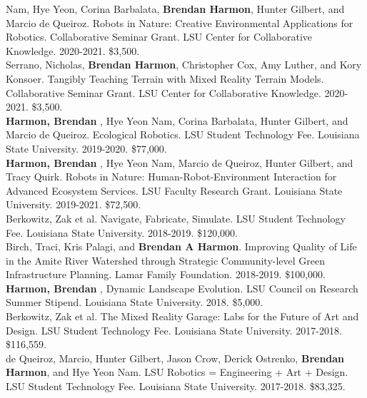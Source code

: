 \documentclass[10pt]{developercv} %
\begin{document}
Nam, Hye Yeon, Corina Barbalata, \textbf{Brendan Harmon}, Hunter Gilbert, and Marcio de Queiroz.
Robots in Nature: Creative Environmental Applications for Robotics.
Collaborative Seminar Grant. LSU Center for Collaborative Knowledge.
2020-2021. \$3,500.\\

Serrano, Nicholas, \textbf{Brendan Harmon}, Christopher Cox, Amy Luther, and Kory Konsoer.
Tangibly Teaching Terrain with Mixed Reality Terrain Models.
Collaborative Seminar Grant. LSU Center for Collaborative Knowledge.
2020-2021. \$3,500.\\

\textbf{Harmon, Brendan }, Hye Yeon Nam, Corina Barbalata, Hunter Gilbert, and Marcio de Queiroz.
Ecological Robotics.
LSU Student Technology Fee. Louisiana State University. 
2019-2020.	\$77,000.\\

\textbf{Harmon, Brendan }, Hye Yeon Nam, Marcio de Queiroz, Hunter Gilbert, and Tracy Quirk. 
Robots in Nature: Human-Robot-Environment Interaction for Advanced Ecosystem Services. 
LSU Faculty Research Grant. Louisiana State University. 
2019-2021. \$72,500.\\

Berkowitz, Zak et al. Navigate, Fabricate, Simulate. 
LSU Student Technology Fee. Louisiana State University. 
2018-2019.	\$120,000.\\

Birch, Traci, Kris Palagi, and \textbf{Brendan A Harmon}. 
Improving Quality of Life in the Amite River Watershed through Strategic Community-level Green Infrastructure Planning. 
Lamar Family Foundation. 
2018-2019. \$100,000.\\

\textbf{Harmon, Brendan }, 
Dynamic Landscape Evolution. 
LSU Council on Research Summer Stipend. Louisiana State University. 
2018. \$5,000.\\

Berkowitz, Zak et al. 
The Mixed Reality Garage: Labs for the Future of Art and Design. 
LSU Student Technology Fee. Louisiana State University. 
2017-2018. \$116,559.\\

de Queiroz, Marcio, Hunter Gilbert, Jason Crow, Derick Ostrenko, \textbf{Brendan Harmon}, and Hye Yeon Nam. 
LSU Robotics = Engineering + Art + Design. 
LSU Student Technology Fee. Louisiana State University. 
2017-2018. \$83,325.\\
\end{document}
